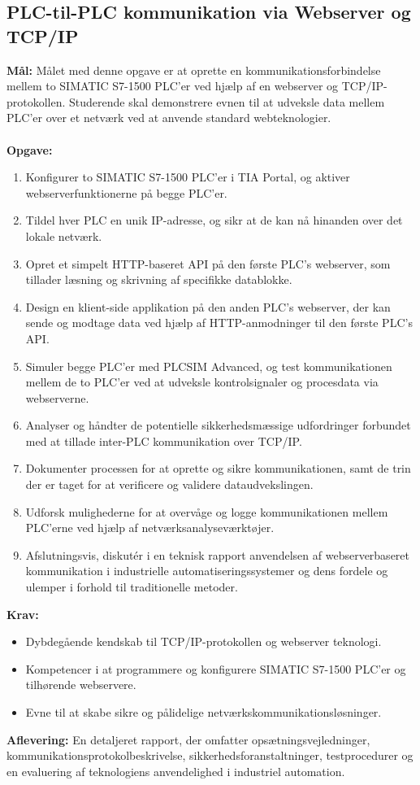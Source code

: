 \subsection*{PLC-til-PLC kommunikation via Webserver og TCP/IP}
\label{subsec:plc_to_plc_comm_tcp}

\textbf{Mål:} Målet med denne opgave er at oprette en kommunikationsforbindelse mellem to SIMATIC S7-1500 PLC'er ved hjælp af en webserver og TCP/IP-protokollen. Studerende skal demonstrere evnen til at udveksle data mellem PLC'er over et netværk ved at anvende standard webteknologier.
\\\\
\noindent\textbf{Opgave:}
\begin{enumerate}
	\item Konfigurer to SIMATIC S7-1500 PLC'er i TIA Portal, og aktiver webserverfunktionerne på begge PLC'er.
	\item Tildel hver PLC en unik IP-adresse, og sikr at de kan nå hinanden over det lokale netværk.
	\item Opret et simpelt HTTP-baseret API på den første PLC's webserver, som tillader læsning og skrivning af specifikke datablokke.
	\item Design en klient-side applikation på den anden PLC's webserver, der kan sende og modtage data ved hjælp af HTTP-anmodninger til den første PLC's API.
	\item Simuler begge PLC'er med PLCSIM Advanced, og test kommunikationen mellem de to PLC'er ved at udveksle kontrolsignaler og procesdata via webserverne.
	\item Analyser og håndter de potentielle sikkerhedsmæssige udfordringer forbundet med at tillade inter-PLC kommunikation over TCP/IP.
	\item Dokumenter processen for at oprette og sikre kommunikationen, samt de trin der er taget for at verificere og validere dataudvekslingen.
	\item Udforsk mulighederne for at overvåge og logge kommunikationen mellem PLC'erne ved hjælp af netværksanalyseværktøjer.
	\item Afslutningsvis, diskutér i en teknisk rapport anvendelsen af webserverbaseret kommunikation i industrielle automatiseringssystemer og dens fordele og ulemper i forhold til traditionelle metoder.
\end{enumerate}

\textbf{Krav:}
\begin{itemize}
	\item Dybdegående kendskab til TCP/IP-protokollen og webserver teknologi.
	\item Kompetencer i at programmere og konfigurere SIMATIC S7-1500 PLC'er og tilhørende webservere.
	\item Evne til at skabe sikre og pålidelige netværkskommunikationsløsninger.
\end{itemize}	
\textbf{Aflevering:} En detaljeret rapport, der omfatter opsætningsvejledninger, kommunikationsprotokolbeskrivelse, sikkerhedsforanstaltninger, testprocedurer og en evaluering af teknologiens anvendelighed i industriel automation.

